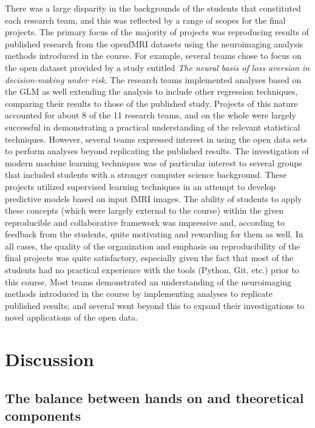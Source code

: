 There was a large disparity in the backgrounds of the students that constituted 
each research team, and this was reflected by a range of scopes for the
final projects.
The primary focus of the majority of projects was reproducing results
of published research from the openfMRI datasets using the neuroimaging 
analysis methods introduced in the course.
For example, several teams chose to focus on the open dataset provided by a
study entitled \textit{The neural basis of loss aversion in decision-making
under risk}\cite{tom2007neutral}.
The research teams implemented analyses based on the GLM as well extending
the analysis to include other regression techniques, comparing their results
to those of the published study.
Projects of this nature accounted for about 8 of the 11 research teams, and
on the whole were largely successful in demonstrating a practical understanding
of the relevant statistical techniques.
However, several teams expressed interest in using the open data sets to 
perform analyses beyond replicating the published results.
The investigation of modern machine learning techniques was of particular 
interest to several groups that included students with a stronger computer
science background.
These projects utilized supervised learning techniques in an attempt to 
develop predictive models based on input fMRI images.
The ability of students to apply these concepts (which were largely external
to the course) within the given reproducible and collaborative 
framework was impressive and, according to feedback from the students, quite
motivating and rewarding for them as well.
In all cases, the quality of the organization and emphasis on reproducibility
of the final projects was quite satisfactory, especially given the fact that
most of the students had no practical experience with the tools (Python, Git,
etc.) prior to this course.
Most teams demonstrated an understanding of the neuroimaging methods introduced
in the course by implementing analyses to replicate published results; and 
several went beyond this to expand their investigations to novel applications
of the open data.


\section{Discussion}\label{discussion}

\subsection{The balance between hands on and theoretical components}

